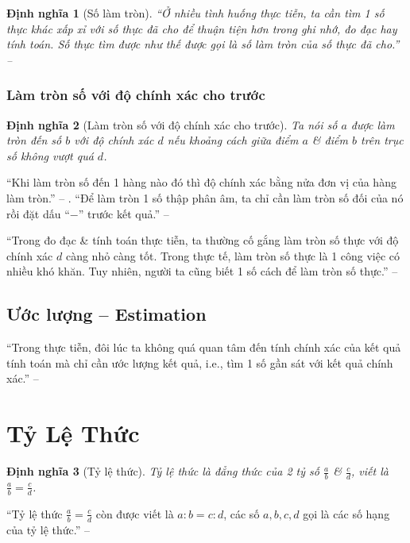 \documentclass[oneside]{book}
\numberwithin{equation}{section}
\newtheorem{dinhnghia}{Định nghĩa}[section]
\begin{document}
\begin{dinhnghia}[Số làm tròn]
	``Ở nhiều tình huống thực tiễn, ta cần tìm 1 số thực khác xấp xỉ với số thực đã cho để thuận tiện hơn trong ghi nhớ, đo đạc hay tính toán. Số thực tìm được như thế được gọi là \emph{số làm tròn} của số thực đã cho.'' -- \cite[p. 48]{SGK_Toan_7_Canh_Dieu_tap_1}
\end{dinhnghia}

\subsubsection{Làm tròn số với độ chính xác cho trước}

\begin{dinhnghia}[Làm tròn số với độ chính xác cho trước]
	Ta nói số $a$ được làm tròn đến số $b$ với độ chính xác $d$ nếu khoảng cách giữa điểm $a$ \& điểm $b$ trên trục số không vượt quá $d$.
\end{dinhnghia}
``Khi làm tròn số đến 1 hàng nào đó thì độ chính xác bằng nửa đơn vị của hàng làm tròn.'' -- \cite[p. 49]{SGK_Toan_7_Canh_Dieu_tap_1}. ``Để làm tròn 1 số thập phân âm, ta chỉ cần làm tròn số đối của nó rồi đặt dấu ``$-$'' trước kết quả.'' -- \cite[p. 50]{SGK_Toan_7_Canh_Dieu_tap_1}

``Trong đo đạc \& tính toán thực tiễn, ta thường cố gắng làm tròn số thực với độ chính xác $d$ càng nhỏ càng tốt. Trong thực tế, làm tròn số thực là 1 công việc có nhiều khó khăn. Tuy nhiên, người ta cũng biết 1 số cách để làm tròn số thực.'' -- \cite[p. 51]{SGK_Toan_7_Canh_Dieu_tap_1}

\subsection{Ước lượng -- Estimation}
``Trong thực tiễn, đôi lúc ta không quá quan tâm đến tính chính xác của kết quả tính toán mà chỉ cần ước lượng kết quả, i.e., tìm 1 số gần sát với kết quả chính xác.'' -- \cite[p. 51]{SGK_Toan_7_Canh_Dieu_tap_1}

\section{Tỷ Lệ Thức}

\begin{dinhnghia}[Tỷ lệ thức]
	\emph{Tỷ lệ thức} là đẳng thức của 2 tỷ số $\frac{a}{b}$ \& $\frac{c}{d}$, viết là $\frac{a}{b} = \frac{c}{d}$.
\end{dinhnghia}
``Tỷ lệ thức $\frac{a}{b} = \frac{c}{d}$ còn được viết là $a:b = c:d$, các số $a,b,c,d$ gọi là các số hạng của tỷ lệ thức.'' -- \cite[p. 52]{SGK_Toan_7_Canh_Dieu_tap_1}
\end{document}
